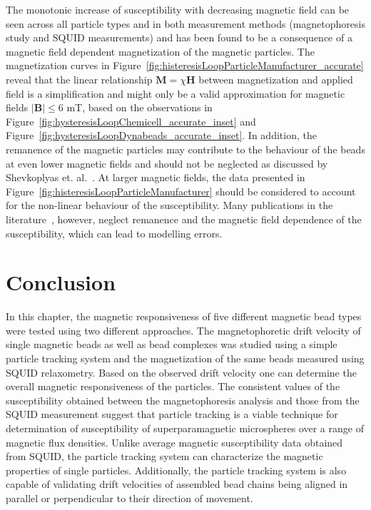 The monotonic increase of susceptibility with decreasing magnetic field can be seen across all particle types and in both measurement methods (magnetophoresis study and SQUID measurements) and has been found to be a consequence of a magnetic field dependent magnetization of the magnetic particles. The magnetization curves in Figure~\ref{fig:histeresisLoopParticleManufacturer_accurate} reveal that the linear relationship $\mathbf{M}=\chi\mathbf{H}$ between magnetization and applied field is a simplification and might only be a valid approximation for magnetic fields $|\mathbf{B}|\leq6$ mT, based on the observations in Figure~\ref{fig:hysteresisLoopChemicell_accurate_inset} and Figure~\ref{fig:hysteresisLoopDynabeads_accurate_inset}. In addition, the remanence of the magnetic particles may contribute to the behaviour of the beads at even lower magnetic fields and should not be neglected as discussed by Shevkoplyas et. al.~\cite{Shevkoplyas2007}. At larger magnetic fields, the data presented in Figure~\ref{fig:histeresisLoopParticleManufacturer} should be considered to account for the non-linear behaviour of the susceptibility. Many publications in the literature~\cite{Zborowski2011,Pamme2004}, however, neglect remanence and the magnetic field dependence of the susceptibility, which can lead to modelling errors.

\section{Conclusion}
In this chapter, the magnetic responsiveness of five different magnetic bead types were tested using two different approaches. The magnetophoretic drift velocity of single magnetic beads as well as bead complexes was studied using a simple particle tracking system and the magnetization of the same beads measured using SQUID relaxometry. Based on the observed drift velocity one can determine the overall magnetic responsiveness of the particles. The consistent values of the susceptibility obtained between the magnetophoresis analysis and those from the SQUID measurement suggest that particle tracking is a viable technique for determination of susceptibility of superparamagnetic microspheres over a range of magnetic flux densities. Unlike average magnetic susceptibility data obtained from SQUID, the particle tracking system can characterize the magnetic properties of single particles. Additionally, the particle tracking system is also capable of validating drift velocities of assembled bead chains being aligned in parallel or perpendicular to their direction of movement.

